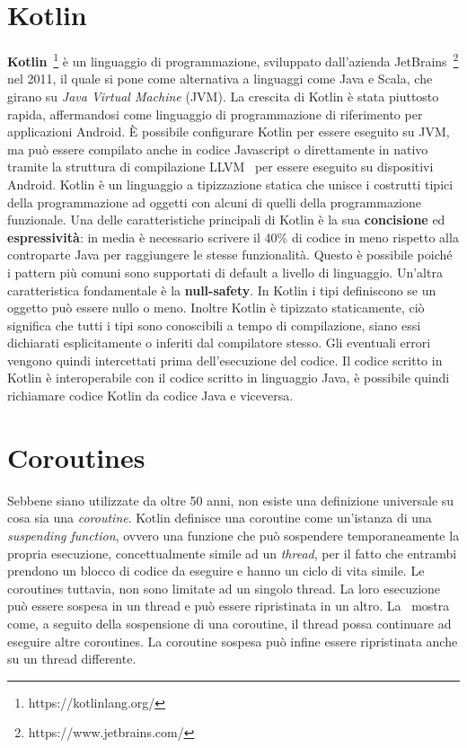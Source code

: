 \documentclass[12pt,a4paper,openright,twoside]{book}
\begin{document}
\section{Kotlin}
\textbf{Kotlin}~\footnote{https://kotlinlang.org/} è un linguaggio di programmazione, sviluppato dall'azienda JetBrains~\footnote{https://www.jetbrains.com/} nel 2011, il quale si pone come alternativa a linguaggi come Java e Scala, che girano su \textit{Java Virtual Machine} (JVM). La crescita di Kotlin è stata piuttosto rapida, affermandosi come linguaggio di programmazione di riferimento per applicazioni Android. 
È possibile configurare Kotlin per essere eseguito su JVM, ma può essere compilato anche in codice Javascript o direttamente in nativo tramite la struttura di compilazione LLVM~\cite{DBLP:conf/lcpc/LattnerA04} per essere eseguito su dispositivi Android. 
Kotlin è un linguaggio a tipizzazione statica che unisce i costrutti tipici della programmazione ad oggetti con alcuni di quelli della programmazione funzionale. 
Una delle caratteristiche principali di Kotlin è la sua \textbf{concisione} ed \textbf{espressività}: in media è necessario scrivere il 40\% di codice in meno rispetto alla controparte Java per raggiungere le stesse funzionalità. Questo è possibile poiché i pattern più comuni sono supportati di default a livello di linguaggio. 
Un'altra caratteristica fondamentale è la \textbf{null-safety}. In Kotlin i tipi definiscono se un oggetto può essere nullo o meno. Inoltre Kotlin è tipizzato staticamente, ciò significa che tutti i tipi sono conoscibili a tempo di compilazione, siano essi dichiarati esplicitamente o inferiti dal compilatore stesso. Gli eventuali errori vengono quindi intercettati prima dell'esecuzione del codice. 
Il codice scritto in Kotlin è interoperabile con il codice scritto in linguaggio Java, è possibile quindi richiamare codice Kotlin da codice Java e viceversa.

\section{Coroutines}
Sebbene siano utilizzate da oltre 50 anni, non esiste una definizione universale su cosa sia una \textit{coroutine}. 
Kotlin definisce una coroutine come un'istanza di una \textit{suspending function}, ovvero una funzione che può sospendere temporaneamente la propria esecuzione, concettualmente simile ad un \textit{thread}, per il fatto che entrambi prendono un blocco di codice da eseguire e hanno un ciclo di vita simile. Le coroutines tuttavia, non sono limitate ad un singolo thread. La loro esecuzione può essere sospesa in un thread e può essere ripristinata in un altro. La~ mostra come, a seguito della sospensione di una coroutine, il thread possa continuare ad eseguire altre coroutines. La coroutine sospesa può infine essere ripristinata anche su un thread differente.  
\end{document}
